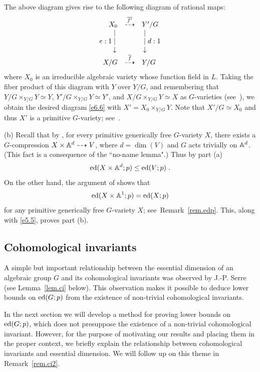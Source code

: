 \begin{pf}
The above diagram gives rise to the following diagram of rational maps:
\[ \begin{array}{rcl}
           X_0  & \stackrel{\overline{f'}}{\dasharrow} &  Y'/G \\ 
           | \; &         & \; |   \\
    e:1 \;   |  \; &         & \; | \; d:1  \\
  \downarrow \, &         & \, \downarrow   \\
           X/G  & \stackrel{\overline{f}}{\dasharrow} &  Y/G 
\end{array} \]
where $X_0$ is an irreducible algebraic variety whose function field in $L$. 
Taking the fiber product of this diagram with $Y$ over $Y/G$, and remembering
that $Y/G \times_{Y/G} Y \simeq Y$, $Y'/G \times_{Y/G} Y \simeq Y'$,
and $X/G \times_{Y/G} Y \simeq X$ as $G$-varieties 
(see~\cite[Lemma 2.14]{r2}), we obtain the desired diagram \eqref{e6.6} with 
$X' = X_0 \times_{Y/G} Y$.
Note that $X'/G \simeq X_0$ and thus $X'$ is a primitive $G$-variety;
see~\cite[Lemma 2.14]{r2}. 


(b) Recall that by \cite[Corollary 2.17]{r2}, for every primitive
generically free
$G$-variety $X$, there exists a $G$-compression $X \times {\Bbb A}^d \dasharrow V$,
where $d = \dim(V)$ and $G$ acts trivially on ${\Bbb A}^d$. (This fact is 
a consequence of the ``no-name lemma".) Thus by part (a) 
 \begin{equation} \label{e5.5}
\operatorname{ed}(X \times {\Bbb A}^d; p) \leq \operatorname{ed}(V; p)  \; .
\end{equation}
On the other hand, the argument of \cite[Lemma 5.3]{br2} shows that 
\[ \operatorname{ed}(X \times {\Bbb A}^1; p) = \operatorname{ed}(X;p) \]
for any primitive generically free $G$-variety $X$; see~Remark~\ref{rem.edp}.
This, along with \eqref{e5.5}, proves part (b). 
\end{pf}

\subsection*{Cohomological invariants}

A simple but important relationship between the essential dimension 
of an algebraic group $G$ and its cohomological invariants was 
observed by J.-P. Serre (see Lemma~\ref{lem.ci} below). This observation
makes it possible to deduce lower bounds on $\operatorname{ed}(G; p)$ from the existence
of non-trivial cohomological invariants.

In the next section we will develop a method for proving
lower bounds on $\operatorname{ed}(G; p)$, which does not presuppose 
the existence of a non-trivial cohomological
invariant.  However, for the purpose of motivating our results and
placing them in the proper context, we briefly explain 
the relationship between cohomological invariants 
and essential dimension. We will follow up on this theme in
Remark~\ref{rem.ci2}.

